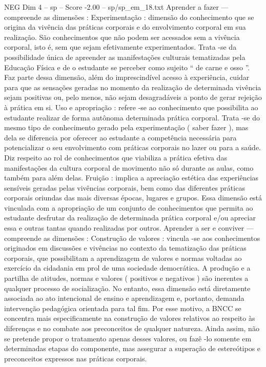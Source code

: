 \begin{textsample}{NEG Dim 4 – sp – Score -2.00 – sp/sp\_em\_18.txt}
Aprender a fazer — compreende as dimensões : Experimentação : dimensão do conhecimento que se origina da vivência das práticas corporais e do envolvimento corporal em sua realização.
São conhecimentos que não podem ser acessados sem a vivência corporal, isto é, sem que sejam efetivamente experimentados.
Trata -se da possibilidade única de apreender as manifestações culturais tematizadas pela Educação Física e de o estudante se perceber como sujeito “ de carne e osso ”.
Faz parte dessa dimensão, além do imprescindível acesso à experiência, cuidar para que as sensações geradas no momento da realização de determinada vivência sejam positivas ou, pelo menos, não sejam desagradáveis a ponto de gerar rejeição à prática em si.
Uso e apropriação : refere -se ao conhecimento que possibilita ao estudante realizar de forma autônoma determinada prática corporal.
Trata -se do mesmo tipo de conhecimento gerado pela experimentação ( saber fazer ), mas dela se diferencia por oferecer ao estudante a competência necessária para potencializar o seu envolvimento com práticas corporais no lazer ou para a saúde.
Diz respeito ao rol de conhecimentos que viabiliza a prática efetiva das manifestações da cultura corporal de movimento não só durante as aulas, como também para além delas.
Fruição : implica a apreciação estética das experiências sensíveis geradas pelas vivências corporais, bem como das diferentes práticas corporais oriundas das mais diversas épocas, lugares e grupos.
Essa dimensão está vinculada com a apropriação de um conjunto de conhecimentos que permita ao estudante desfrutar da realização de determinada prática corporal e/ou apreciar essa e outras tantas quando realizadas por outros.
Aprender a ser e conviver — compreende as dimensões : Construção de valores : vincula -se aos conhecimentos originados em discussões e vivências no contexto da tematização das práticas corporais, que possibilitam a aprendizagem de valores e normas voltadas ao exercício da cidadania em prol de uma sociedade democrática.
A produção e a partilha de atitudes, normas e valores ( positivos e negativos ) são inerentes a qualquer processo de socialização.
No entanto, essa dimensão está diretamente associada ao ato intencional de ensino e aprendizagem e, portanto, demanda intervenção pedagógica orientada para tal fim.
Por esse motivo, a BNCC se concentra mais especificamente na construção de valores relativos ao respeito às diferenças e no combate aos preconceitos de qualquer natureza.
Ainda assim, não se pretende propor o tratamento apenas desses valores, ou fazê -lo somente em determinadas etapas do componente, mas assegurar a superação de estereótipos e preconceitos expressos nas práticas corporais.

\end{textsample}
